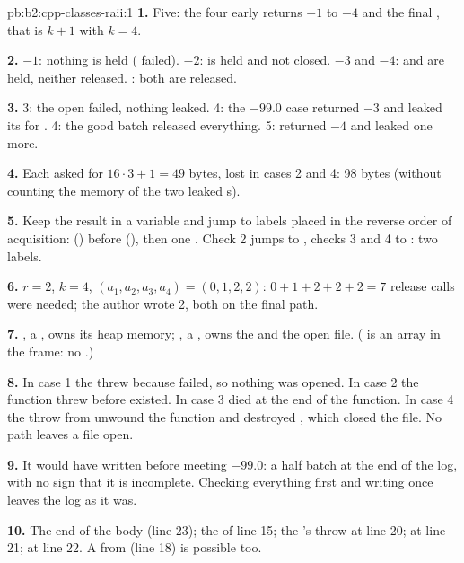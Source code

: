 \begin{solution}{pb:b2:cpp-classes-raii:1}
\textbf{1.} Five: the four early returns $-1$ to $-4$ and the final , that is $k + 1$ with $k = 4$.

\textbf{2.} $-1$: nothing is held ( failed). $-2$:  is held and not closed. $-3$ and $-4$:
 and  are held, neither released. : both are released.

\textbf{3.} 3: the open failed, nothing leaked. 4: the $-99.0$ case returned $-3$ and leaked its  for
. 4: the good batch released everything. 5:  returned $-4$ and leaked one more.

\textbf{4.} Each  asked for $16 \cdot 3 + 1 = 49$ bytes, lost in cases 2 and 4: 98 bytes (without
counting the memory of the two leaked s).

\textbf{5.} Keep the result in a variable and jump to labels placed in the reverse order of acquisition:
 () before  (), then one .
Check 2 jumps to , checks 3 and 4 to : two labels.

\textbf{6.} $r = 2$, $k = 4$, $(a_1, a_2, a_3, a_4) = (0, 1, 2, 2)$: $0 + 1 + 2 + 2 + 2 = 7$ release calls were
needed; the author wrote 2, both on the final path.

\textbf{7.} , a , owns its heap memory; , a , owns the 
and the open file. ( is an array in the frame: no .)

\textbf{8.} In case 1 the   threw because  failed, so nothing was opened. In case 2
the function threw before  existed. In case 3  died at the end of the function. In case 4 the throw
from  unwound the function and destroyed , which closed the file. No path leaves a file open.

\textbf{9.} It would have written  before meeting $-99.0$: a half batch at the end of the log, with no
sign that it is incomplete. Checking everything first and writing once leaves the log as it was.

\textbf{10.} The end of the body (line 23); the  of line 15; the  's throw at line
20;  at line 21;  at line 22. A  from  (line 18) is
possible too.


\end{solution}
